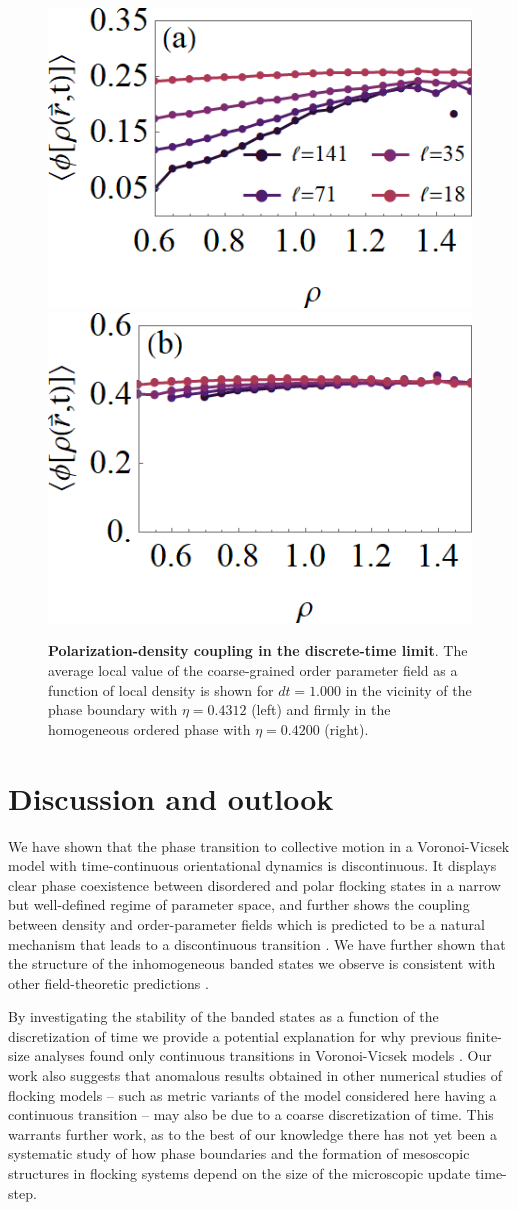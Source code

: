 \documentclass[twoside,twocolumn,9pt]{article}
\begin{document}
\begin{figure}[h]
	\centering
	\includegraphics[width=0.50\columnwidth]{phi_func_rho_dt=1.000_e=0.4312.png}
	\includegraphics[width=0.48\columnwidth]{phi_func_rho_dt=1.000_e=0.4200.png}
    \caption{\textbf{Polarization-density coupling in the discrete-time limit}.
		The average local value of the coarse-grained order parameter field as a function of local density is shown for $dt=1.000$ in the vicinity of the phase boundary with $\eta=0.4312$ (left) and firmly in the homogeneous ordered phase with $\eta=0.4200$ (right).
	}
	\label{fig:PolarizationDensityCoupling}
\end{figure}

\section{Discussion and outlook}

We have shown that the phase transition to collective motion in a Voronoi-Vicsek model with time-continuous orientational dynamics is discontinuous.
It displays clear phase coexistence between disordered and polar flocking states in a narrow but well-defined regime of parameter space, and further shows the coupling between density and order-parameter fields which is predicted to be a natural mechanism that leads to a discontinuous transition \cite{martin2021fluctuation}. 
We have further shown that the structure of the inhomogeneous banded states we observe is consistent with other field-theoretic predictions \cite{solon2015pattern}.

By investigating the stability of the banded states as a function of the discretization of time we provide a potential explanation for why previous finite-size analyses found only continuous transitions in Voronoi-Vicsek models \cite{ginelli2010relevance}.
Our work also suggests that anomalous results obtained in other numerical studies of flocking models -- such as metric variants of the model considered here having a continuous transition \cite{chepizhko2021revisiting} -- may also be due to a coarse discretization of time.
This warrants further work, as to the best of our knowledge there has not yet been a systematic study of how phase boundaries and the formation of mesoscopic structures in flocking systems depend on the size of the microscopic update time-step.
\end{document}
